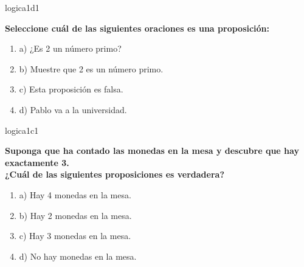 \documentclass{article}
\begin{document}
\begin{question}{1}{logica}{1}{d}{1}{
\textbf{Seleccione cuál de las siguientes oraciones \textbf{es} una proposición:}\\

\begin{enumerate}
    \item a) ¿Es 2 un número primo?
    \item b) Muestre que 2 es un número primo.
    \item c) Esta proposición es falsa.
    \item d) Pablo va a la universidad.
\end{enumerate}
}
\end{question}

\begin{question}{2}{logica}{1}{c}{1}{
\textbf{Suponga que ha contado las monedas en la mesa y descubre que hay exactamente 3.}\\
\textbf{¿Cuál de las siguientes proposiciones es \textbf{verdadera}?}\\

\begin{enumerate}
    \item a) Hay 4 monedas en la mesa.
    \item b) Hay 2 monedas en la mesa.
    \item c) Hay 3 monedas en la mesa.
    \item d) No hay monedas en la mesa.
\end{enumerate}
}
\end{question}
\end{document}
